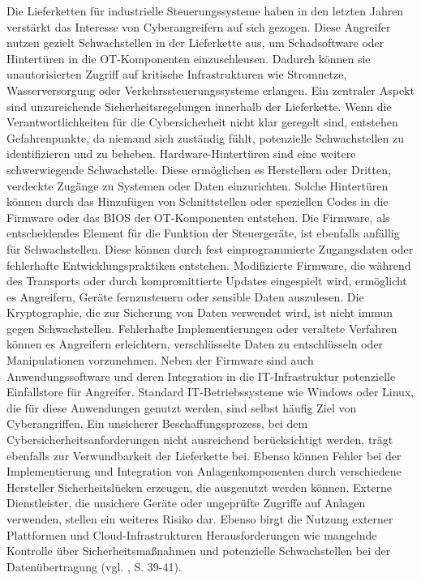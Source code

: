 Die Lieferketten für industrielle Steuerungssysteme haben in den letzten Jahren verstärkt das Interesse von Cyberangreifern auf sich gezogen. Diese Angreifer nutzen gezielt Schwachstellen in der Lieferkette aus, um Schadsoftware oder Hintertüren in die OT-Komponenten einzuschleusen. Dadurch können sie unautorisierten Zugriff auf kritische Infrastrukturen wie Stromnetze, Wasserversorgung oder Verkehrssteuerungssysteme erlangen.
Ein zentraler Aspekt sind unzureichende Sicherheitsregelungen innerhalb der Lieferkette. Wenn die Verantwortlichkeiten für die Cybersicherheit nicht klar geregelt sind, entstehen Gefahrenpunkte, da niemand sich zuständig fühlt, potenzielle Schwachstellen zu identifizieren und zu beheben. Hardware-Hintertüren sind eine weitere schwerwiegende Schwachstelle. Diese ermöglichen es Herstellern oder Dritten, verdeckte Zugänge zu Systemen oder Daten einzurichten. Solche Hintertüren können durch das Hinzufügen von Schnittstellen oder speziellen Codes in die Firmware oder das BIOS der OT-Komponenten entstehen. Die Firmware, als entscheidendes Element für die Funktion der Steuergeräte, ist ebenfalls anfällig für Schwachstellen. Diese können durch fest einprogrammierte Zugangsdaten oder fehlerhafte Entwicklungspraktiken entstehen. Modifizierte Firmware, die während des Transports oder durch kompromittierte Updates eingespielt wird, ermöglicht es Angreifern, Geräte fernzusteuern oder sensible Daten auszulesen. Die Kryptographie, die zur Sicherung von Daten verwendet wird, ist nicht immun gegen Schwachstellen. Fehlerhafte Implementierungen oder veraltete Verfahren können es Angreifern erleichtern, verschlüsselte Daten zu entschlüsseln oder Manipulationen vorzunehmen. Neben der Firmware sind auch Anwendungssoftware und deren Integration in die IT-Infrastruktur potenzielle Einfallstore für Angreifer. Standard IT-Betriebssysteme wie Windows oder Linux, die für diese Anwendungen genutzt werden, sind selbst häufig Ziel von Cyberangriffen. Ein unsicherer Beschaffungsprozess, bei dem Cybersicherheitsanforderungen nicht ausreichend berücksichtigt werden, trägt ebenfalls zur Verwundbarkeit der Lieferkette bei. Ebenso können Fehler bei der Implementierung und Integration von Anlagenkomponenten durch verschiedene Hersteller Sicherheitslücken erzeugen, die ausgenutzt werden können. Externe Dienstleister, die unsichere Geräte oder ungeprüfte Zugriffe auf Anlagen verwenden, stellen ein weiteres Risiko dar. Ebenso birgt die Nutzung externer Plattformen und Cloud-Infrastrukturen Herausforderungen wie mangelnde Kontrolle über Sicherheitsmaßnahmen und potenzielle Schwachstellen bei der Datenübertragung (vgl. \cite{ICS}, S. 39-41).


